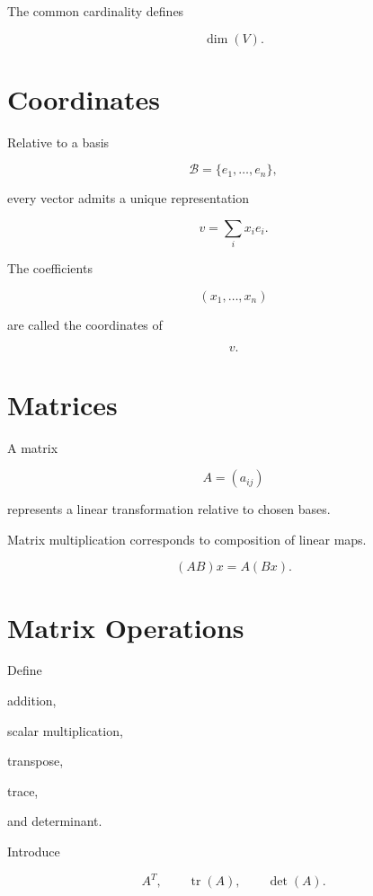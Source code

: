 \documentclass[11pt,fleqn]{book}
\numberwithin{equation}{chapter}
\theoremstyle{plain}
\theoremstyle{definition}
\theoremstyle{remark}
\begin{document}
The common cardinality defines

\[
\dim(V).
\]


\section{Coordinates}

Relative to a basis

\[
\mathcal B
=
\{e_1,\ldots,e_n\},
\]

every vector admits a unique representation

\[
v
=
\sum_i
x_i e_i.
\]

The coefficients

\[
(x_1,\ldots,x_n)
\]

are called the coordinates of

\[
v.
\]


\section{Matrices}

A matrix

\[
A
=
(a_{ij})
\]

represents a linear transformation relative to chosen bases.

Matrix multiplication corresponds to composition of linear maps.

\[
(AB)x
=
A(Bx).
\]


\section{Matrix Operations}

Define

addition,

scalar multiplication,

transpose,

trace,

and determinant.

Introduce

\[
A^T,
\qquad
\operatorname{tr}(A),
\qquad
\det(A).
\]

\end{document}
